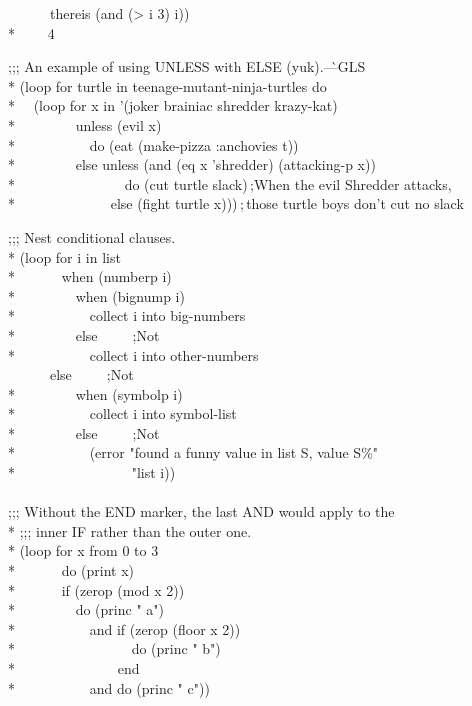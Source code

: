 \begin{new}
\begin{defloop}
\begin{lisp}
~~~~~~thereis (and (> i 3) i)) \\*
~~~\EV~4
\end{lisp}
\begin{lisp}
;;; An example of using UNLESS with ELSE (yuk).\`{\rm ---GLS} \\*
(loop for turtle in teenage-mutant-ninja-turtles do\\*
~~(loop for x in '(joker brainiac shredder krazy-kat) \\*
~~~~~~~~unless (evil x) \\*
~~~~~~~~~~do (eat (make-pizza :anchovies t)) \\*
~~~~~~~~else unless (and (eq x 'shredder) (attacking-p x))\\*
~~~~~~~~~~~~~~~do (cut turtle slack)\,;{\rm When the evil Shredder attacks,} \\*
~~~~~~~~~~~~~else (fight turtle x)))\,;\,{\rm those turtle boys don't cut no slack}
\end{lisp}
\goodbreak
\begin{lisp}
;;; Nest conditional clauses. \\*
(loop for i in list \\*
~~~~~~when (numberp i) \\*
~~~~~~~~when (bignump i) \\*
~~~~~~~~~~collect i into big-numbers \\*
~~~~~~~~else~~~~~;{\rm Not } \\*
~~~~~~~~~~collect i into other-numbers \\
~~~~~~else~~~~~;{\rm Not } \\*
~~~~~~~~when (symbolp i)  \\*
~~~~~~~~~~collect i into symbol-list \\*
~~~~~~~~else~~~~~;{\rm Not } \\*
~~~~~~~~~~(error "found a funny value in list {\Xtilde}S, value {\Xtilde}S{\Xtilde}\%" \\*
~~~~~~~~~~~~~~~~"list i)) \\
 \\
;;; Without the END marker, the last AND would apply to the \\*
;;; inner IF rather than the outer one. \\*
(loop for x from 0 to 3  \\*
~~~~~~do (print x) \\*
~~~~~~if (zerop (mod x 2)) \\*
~~~~~~~~do (princ " a") \\*
~~~~~~~~~~and if (zerop (floor x 2)) \\*
~~~~~~~~~~~~~~~~do (princ " b") \\*
~~~~~~~~~~~~~~end \\*
~~~~~~~~~~and do (princ " c"))
\end{lisp}
\end{defloop}



\end{new}
